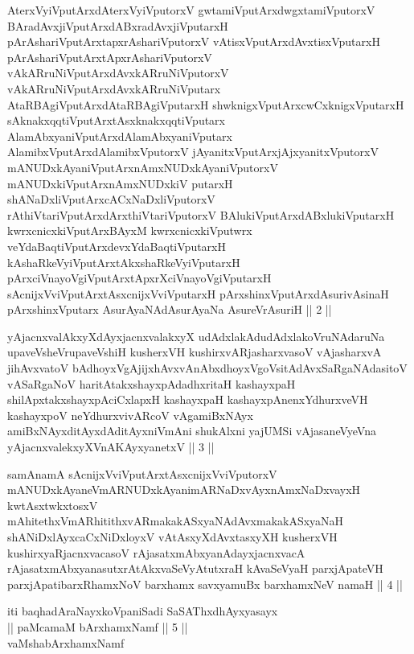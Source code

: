 \begin{kandikeshl}
AterxVyiVputArxdAterxVyiVputorxV gwtamiVputArxdwgxtamiVputorxV BAradAvxjiVputArxdABxradAvxjiVputarxH pArAshariVputArxtapxrAshariVputorxV vAtisxVputArxdAvxtisxVputarxH pArAshariVputArxtApxrAshariVputorxV vAkARruNiVputArxdAvxkARruNiVputorxV vAkARruNiVputArxdAvxkARruNiVputarx AtaRBAgiVputArxdAtaRBAgiVputarxH shwknigxVputArxcwCxknigxVputarxH sAknakxqqtiVputArxtAsxknakxqqtiVputarx AlamAbxyaniVputArxdAlamAbxyaniVputarx AlamibxVputArxdAlamibxVputorxV jAyanitxVputArxjAjxyanitxVputorxV mANUDxkAyaniVputArxnAmxNUDxkAyaniVputorxV mANUDxkiVputArxnAmxNUDxkiV putarxH shANaDxliVputArxcACxNaDxliVputorxV rAthiVtariVputArxdArxthiVtariVputorxV BAlukiVputArxdABxlukiVputarxH kwrxcnicxkiVputArxBAyxM kwrxcnicxkiVputwrx veYdaBaqtiVputArxdevxYdaBaqtiVputarxH kAshaRkeVyiVputArxtAkxshaRkeVyiVputarxH pArxciVnayoVgiVputArxtApxrXciVnayoVgiVputarxH sAcnijxVviVputArxtAsxcnijxVviVputarxH pArxshinxVputArxdAsurivAsinaH pArxshinxVputarx AsurAyaNAdAsurAyaNa AsureVrAsuriH || 2 ||
\end{kandikeshl}

\begin{kandikeshl}
yAjacnxvalAkxyXdAyxjacnxvalakxyX udAdxlakAdudAdxlakoV\s ruNAdaruNa upaveVsheVrupaveVshiH kusherxVH kushirxvARjasharxvasoV vAjasharxvA jihAvxvatoV bAdhoyxVgAjijxhAvxvAnAbxdhoyxVgoV\s sitAdAvxSaRgaNAdasitoV vASaRgaNoV haritAtakxshayxpAdadhxritaH kashayxpaH shilApxtakxshayxpAciCxlapxH kashayxpaH kashayxpAnenxYdhurxveVH kashayxpoV neYdhurxvivARcoV vAgamiBxNAyx amiBxNAyxditAyxdAditAyxniVmAni shukAlxni yajUMSi vAjasaneVyeVna yAjacnxvalekxyXVnAKAyxyanetxV || 3 ||
\end{kandikeshl}

\begin{kandikeshl}
samAnamA sAcnijxVviVputArxtAsxcnijxVviVputorxV mANUDxkAyaneVmARNUDxkAyanimARNaDxvAyxnAmxNaDxvayxH kwtAsxtwkxtosxV mAhitethxVmARhitithxvARmakakASxyaNAdAvxmakakASxyaNaH shANiDxlAyxcaCxNiDxloyxV vAtAsxyXdAvxtasxyXH kusherxVH kushirxyaRjacnxvacasoV rAjasatxmAbxyanAdayxjacnxvacA rAjasatxmAbxyanasutxrAtAkxvaSeVyAtutxraH kAvaSeVyaH parxjApateVH parxjApatibarxRhamxNoV barxhamx savxyamuBx barxhamxNeV namaH || 4 ||
\end{kandikeshl}

\begin{center}
iti baqhadAraNayxkoVpaniSadi SaSAThxdhAyxyasayx\\
|| paMcamaM bArxhamxNamf || 5 ||\\
vaMshabArxhamxNamf\\
\end{center}

